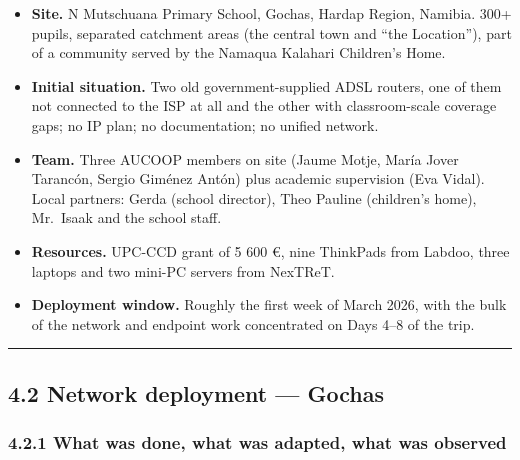 \begin{itemize}
\tightlist
\item
  \textbf{Site.} N Mutschuana Primary School, Gochas, Hardap Region,
  Namibia. 300+ pupils, separated catchment areas (the central town and
  ``the Location''), part of a community served by the Namaqua Kalahari
  Children's Home.
\item
  \textbf{Initial situation.} Two old government-supplied ADSL routers,
  one of them not connected to the ISP at all and the other with
  classroom-scale coverage gaps; no IP plan; no documentation; no
  unified network.
\item
  \textbf{Team.} Three AUCOOP members on site (Jaume Motje, María Jover
  Tarancón, Sergio Giménez Antón) plus academic supervision (Eva Vidal).
  Local partners: Gerda (school director), Theo Pauline (children's
  home), Mr.~Isaak and the school staff.
\item
  \textbf{Resources.} UPC-CCD grant of 5 600 €, nine ThinkPads from
  Labdoo, three laptops and two mini-PC servers from NexTReT.
\item
  \textbf{Deployment window.} Roughly the first week of March 2026, with
  the bulk of the network and endpoint work concentrated on Days 4--8 of
  the trip.
\end{itemize}

\begin{center}\rule{0.5\linewidth}{0.5pt}\end{center}

\hypertarget{network-deployment-gochas}{%
\subsection{4.2 Network deployment ---
Gochas}\label{network-deployment-gochas}}

\hypertarget{what-was-done-what-was-adapted-what-was-observed}{%
\subsubsection{4.2.1 What was done, what was adapted, what was
observed}\label{what-was-done-what-was-adapted-what-was-observed}}

